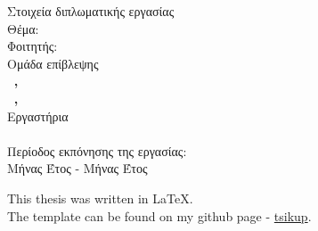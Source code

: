 \pagestyle{empty}
\hspace{10pt}
\begin{center}
\Large{Στοιχεία διπλωματικής εργασίας}\\[1cm]
{\large Θέμα:}
\textbf{\large \doctitle}\\[1cm]
\large {Φοιτητής: \textbf{\nomme}\\[1cm]
\large{Ομάδα επίβλεψης}\\
\textbf{\suptitle \, \supname , \supuni}\\[1cm]
\textbf{\cosuptitle \, \cosupname , \cosupuni} \\[1cm]
Εργαστήρια\\
\lab \\[1cm]
Περίοδος εκπόνησης της εργασίας:\\ Μήνας Έτος - Μήνας Έτος\\[1cm]}
\end{center}

\vspace{5em}

\begin{center}
  { \large
    This thesis was written in \LaTeX.\\
    The template can be found on my github page - \href{https://www.github.com/tsikup}{tsikup}.
  }
\end{center}
